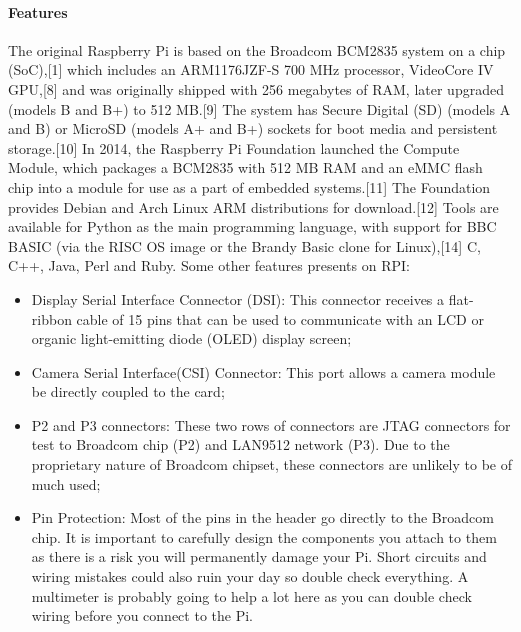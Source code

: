 \documentclass{acm_proc_article-sp}
\begin{document}
\paragraph{Features}
The original Raspberry Pi is based on the Broadcom BCM2835 system on a chip (SoC),[1] which includes an ARM1176JZF-S 700 MHz processor, VideoCore IV GPU,[8] and was originally shipped with 256 megabytes of RAM, later upgraded (models B and B+) to 512 MB.[9] The system has Secure Digital (SD) (models A and B) or MicroSD (models A+ and B+) sockets for boot media and persistent storage.[10]
\newline
\newline
In 2014, the Raspberry Pi Foundation launched the Compute Module, which packages a BCM2835 with 512 MB RAM and an eMMC flash chip into a module for use as a part of embedded systems.[11]
The Foundation provides Debian and Arch Linux ARM distributions for download.[12] Tools are available for Python as the main programming language, with support for BBC BASIC (via the RISC OS image or the Brandy Basic clone for Linux),[14] C, C++, Java, Perl and Ruby.
\newline
\newline
Some other features presents on RPI:
\begin{itemize}
\item Display Serial Interface Connector (DSI): This connector receives a flat-ribbon cable of 15 pins that can be used to communicate with an LCD or organic light-emitting diode (OLED) display screen;	
\item Camera Serial Interface(CSI) Connector: This port allows a camera module be directly coupled to the card;
\item P2 and P3 connectors: These two rows of connectors are JTAG connectors for test to Broadcom chip (P2) and LAN9512 network (P3). Due to the proprietary nature of Broadcom chipset, these connectors are unlikely to be of much used;
\item Pin Protection: Most of the pins in the header go directly to the Broadcom chip. It is important to carefully design the components you attach to them as there is a risk you will permanently damage your Pi. Short circuits and wiring mistakes could also ruin your day so double check everything. A multimeter is probably going to help a lot here as you can double check wiring before you connect to the Pi.
\end{itemize}

 
\end{document}
